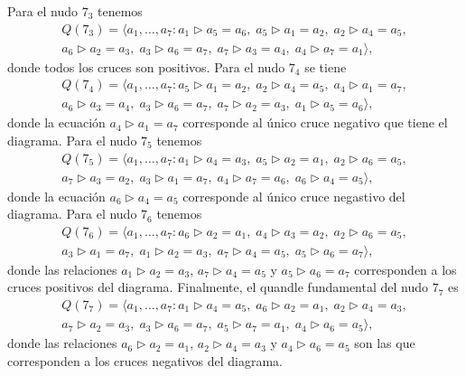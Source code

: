 \documentclass[graybox]{svmult}
\begin{document}
	Para el nudo $7_3$ tenemos
	\begin{multline}
		Q(7_3)=\langle a_1,\dots,a_7:
		a_1\triangleright a_5=a_6,\;
		a_5\triangleright a_1=a_2,\;
		a_2\triangleright a_4=a_5,\\
		a_6\triangleright a_2=a_3,\;
		a_3\triangleright a_6=a_7,\;
		a_7\triangleright a_3=a_4,\;
		a_4\triangleright a_7=a_1\rangle,
	\end{multline}
    donde todos los cruces son positivos. 
    Para el nudo $7_4$ se tiene
	\begin{multline}
		Q(7_4)=\langle a_1,\dots,a_7:
		a_5\triangleright a_1=a_2,\;
		a_2\triangleright a_4=a_5,\;
		a_4\triangleright a_1=a_7,\\
		a_6\triangleright a_3=a_4,\;
		a_3\triangleright a_6=a_7,\;
		a_7\triangleright a_2=a_3,\;
		a_1\triangleright a_5=a_6\rangle,
	\end{multline}
    donde la ecuación $a_4\triangleright a_1=a_7$ corresponde al único cruce
    negativo que tiene el diagrama. 
	Para el nudo $7_5$ tenemos
	\begin{multline}
		Q(7_5)=\langle a_1,\dots,a_7:
		a_1\triangleright a_4=a_3,\;
		a_5\triangleright a_2=a_1,\;
		a_2\triangleright a_6=a_5,\\
		a_7\triangleright a_3=a_2,\;
		a_3\triangleright a_1=a_7,\;
		a_4\triangleright a_7=a_6,\;
		a_6\triangleright a_4=a_5\rangle,
	\end{multline}
    donde la ecuación $a_6\triangleright a_4=a_5$ corresponde al único cruce
    negastivo del diagrama.  
	Para el nudo $7_6$ tenemos
	\begin{multline}
		Q(7_6)=\langle a_1,\dots,a_7:
		a_6\triangleright a_2=a_1,\;
		a_4\triangleright a_3=a_2,\;
		a_2\triangleright a_6=a_5,\\
		a_3\triangleright a_1=a_7,\;
		a_1\triangleright a_2=a_3,\;
		a_7\triangleright a_4=a_5,\;
		a_5\triangleright a_6=a_7\rangle,
	\end{multline}
    donde las relaciones $a_1\triangleright a_2=a_3$, $a_7\triangleright
    a_4=a_5$ y $a_5\triangleright a_6=a_7$ corresponden a los cruces positivos
    del diagrama. 
	Finalmente, el quandle fundamental del nudo $7_7$ es
	\begin{multline}
		Q(7_7)=\langle a_1,\dots,a_7:
		a_1\triangleright a_4=a_5,\;
		a_6\triangleright a_2=a_1,\;
		a_2\triangleright a_4=a_3,\\
		a_7\triangleright a_2=a_3,\;
		a_3\triangleright a_6=a_7,\;
		a_5\triangleright a_7=a_1,\;
		a_4\triangleright a_6=a_5\rangle,
	\end{multline}
    donde las relaciones $a_6\triangleright a_2=a_1$, $a_2\triangleright
    a_4=a_3$ y $a_4\triangleright a_6=a_5$ son las que corresponden a los
    cruces negativos del diagrama. 
\end{document}

